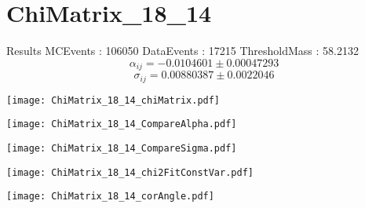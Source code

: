 \documentclass[a4paper,12pt]{article}
\begin{document}
\section{ChiMatrix\_18\_14}
\begin{minipage}{0.49\linewidth} Results \newline
MCEvents : 106050\newline
DataEvents : 17215 \newline
ThresholdMass : 58.2132\\
$$\alpha_{ij} = -0.0104601\pm 0.00047293$$
$$\sigma_{ij} = 0.00880387\pm 0.0022046$$
\end{minipage}\hfill
\begin{minipage}{0.49\linewidth} 
\texttt{[image: ChiMatrix\_18\_14\_chiMatrix.pdf]}\\
\end{minipage}
\hfill
\begin{minipage}{0.49\linewidth} 
\texttt{[image: ChiMatrix\_18\_14\_CompareAlpha.pdf]}\\
\end{minipage}
\hfill
\begin{minipage}{0.49\linewidth} 
\texttt{[image: ChiMatrix\_18\_14\_CompareSigma.pdf]}\\
\end{minipage}
\begin{minipage}{0.49\linewidth} 
\texttt{[image: ChiMatrix\_18\_14\_chi2FitConstVar.pdf]}\\
\end{minipage}
\hfill
\begin{minipage}{0.49\linewidth} 
\texttt{[image: ChiMatrix\_18\_14\_corAngle.pdf]}\\
\end{minipage}
\end{document}
